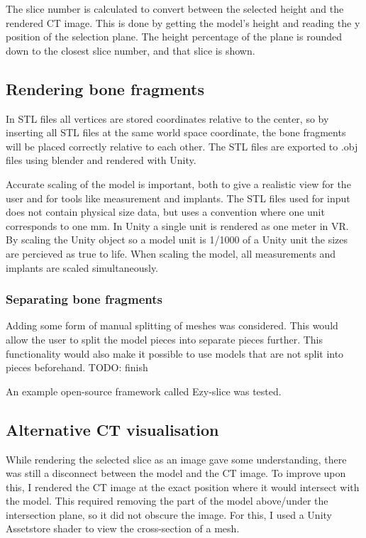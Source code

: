 \documentclass[a4paper]{report}
\begin{document}
The slice number is calculated to convert between the selected height and the rendered CT image. This is done by getting the model's height and reading the y position of the selection plane. The height percentage of the plane is rounded down to the closest slice number, and that slice is shown.

\subsection{Rendering bone fragments}
In STL files all vertices are stored coordinates relative to the center, so by inserting all STL files at the same world space coordinate, the bone fragments will be placed correctly relative to each other. The STL files are exported to .obj files using blender and rendered with Unity.

Accurate scaling of the model is important, both to give a realistic view for the user and for tools like measurement and implants. The STL files used for input does not contain physical size data, but uses a convention where one unit corresponds to one mm. In Unity a single unit is rendered as one meter in VR. By scaling the Unity object so a model unit is 1/1000 of a Unity unit the sizes are percieved as true to life. When scaling the model, all measurements and implants are scaled simultaneously.

\subsubsection{Separating bone fragments}
Adding some form of manual splitting of meshes was considered. This would allow the user to split the model pieces into separate pieces further. This functionality would also make it possible to use models that are not split into pieces beforehand.
TODO: finish

An example open-source framework called Ezy-slice\cite{arayan_davidarayanezy-slice_2022} was tested.

\subsection{Alternative CT visualisation}
While rendering the selected slice as an image gave some understanding, there was still a disconnect between the model and the CT image. To improve upon this, I rendered the CT image at the exact position where it would intersect with the model.
This required removing the part of the model above/under the intersection plane, so it did not obscure the image. For this, I used a Unity Assetstore shader to view the cross-section of a mesh\cite{aldandarawy_unity_2019}.
\end{document}
